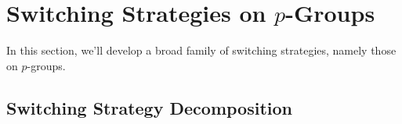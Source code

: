 %
%
\section{Switching Strategies on \texorpdfstring{$p$}{p}-Groups}
\label{sec:pGroupStrategy}
In this section, we'll develop a broad family of switching strategies,
namely those on $p$-groups.
\subsection{Switching Strategy Decomposition}


